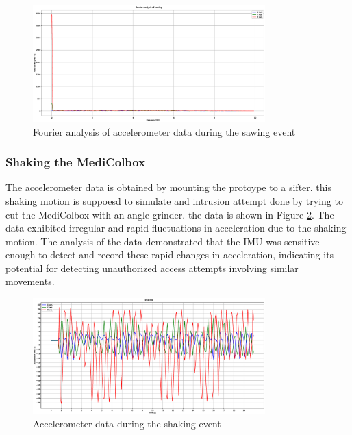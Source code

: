 \documentclass[../main.tex]{subfiles}
\begin{document}
\begin{figure}[htbp]
    \centering
    \includegraphics[width=0.8\textwidth]{resources/figures/Fourier_acceleration_sawing.eps}
    \caption{Fourier analysis of accelerometer data during the sawing event}
    \label{fig:fourier_accelerometer_sawing}
\end{figure}

\vspace{30px}

\subsubsection{Shaking the MediColbox}

The accelerometer data is obtained by mounting the protoype to a sifter. 
this shaking motion is suppoesd to simulate and intrusion attempt done by trying to cut the MediColbox with an angle grinder.
the data is shown in Figure \ref{fig:accelerometer_shaking}.
The data exhibited irregular and rapid fluctuations in
acceleration due to the shaking motion.
The analysis of the data demonstrated that the IMU was
sensitive enough to detect and record these rapid changes in
acceleration, indicating its potential for
detecting unauthorized access attempts involving
similar movements.

\begin{figure}[htbp]
    \centering
    \includegraphics[width=0.8\textwidth]{resources/figures/Acceleration_shaking.eps}
    \caption{Accelerometer data during the shaking event}
    \label{fig:accelerometer_shaking}
\end{figure}
\end{document}
